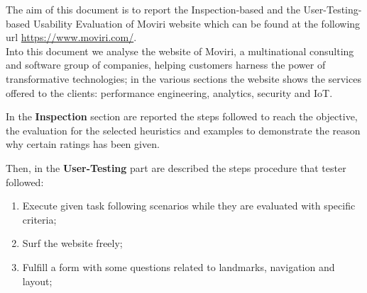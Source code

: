 The aim of this document is to report the Inspection-based and the User-Testing-based Usability Evaluation of Moviri website which can be found at the following url \url{https://www.moviri.com/}.  
\\
Into this document we analyse the website of Moviri, a multinational consulting and software group of companies, helping customers harness the power of transformative technologies; in the various sections the website shows the services offered to the clients: performance engineering, analytics, security and IoT. 
\par
In the \textbf{Inspection} section are reported the steps followed to reach the objective, the evaluation for the selected heuristics and examples to demonstrate the reason why certain ratings has been given. 
\par
Then, in the \textbf{User-Testing} part are described the steps procedure that tester followed: 
\begin{enumerate} 
\item Execute given task following scenarios while they are evaluated with specific criteria;\item Surf the website freely;
\item Fulfill a form with some questions related to landmarks, navigation and layout; 
\end{enumerate}


